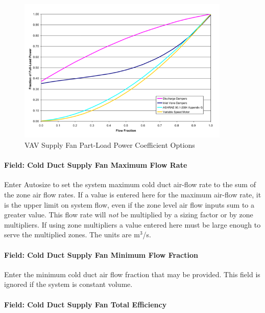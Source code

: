\begin{figure}[hbtp] %
\centering
\includegraphics[width=0.9\textwidth, height=0.9\textheight, keepaspectratio=true]{media/image613.png}
\caption{VAV Supply Fan Part-Load Power Coefficient Options \protect \label{fig:vav-supply-fan-part-load-power-coefficient-002}}
\end{figure}

\paragraph{Field: Cold Duct Supply Fan Maximum Flow Rate}\label{field-cold-duct-supply-fan-maximum-flow-rate}

Enter Autosize to set the system maximum cold duct air-flow rate to the sum of the zone air flow rates. If a value is entered here for the maximum air-flow rate, it is the upper limit on system flow, even if the zone level air flow inputs sum to a greater value. This flow rate will \emph{not} be multiplied by a sizing factor or by zone multipliers. If using zone multipliers a value entered here must be large enough to serve the multiplied zones. The units are m\(^{3}\)/s.

\paragraph{Field: Cold Duct Supply Fan Minimum Flow Fraction}\label{field-cold-duct-supply-fan-minimum-flow-fraction}

Enter the minimum cold duct air flow fraction that may be provided. This field is ignored if the system is constant volume.

\paragraph{Field: Cold Duct Supply Fan Total Efficiency}\label{field-cold-duct-supply-fan-total-efficiency}

